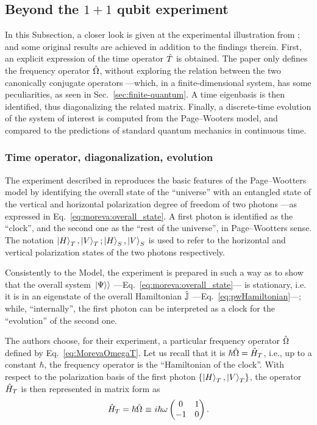 \subsection{Beyond the $1+1$ qubit experiment}\label{sec:beyondMoreva}

In this Subsection, a closer look is given at the experimental illustration from \cite{Moreva:illustration};
and some original results are achieved in addition to the findings therein.
%
First, an explicit expression of the time operator $\hat{T}$
is obtained.
The \mbox{paper} \parencite{Moreva:illustration}
only defines the frequency operator $\hat{\Omega}$,
without exploring the relation between the two canonically conjugate operators
---which, in a finite-dimensional system, has some peculiarities, as seen in Sec.~\ref{sec:finite-quantum}.
%
A time eigenbasis is then identified, thus diagonalizing the related matrix.
%
Finally, a discrete-time evolution of the system of interest is computed from the Page--Wooters model,
and compared to the predictions of
standard quantum mechanics in continuous time.

\subsubsection{Time operator, diagonalization, evolution}
\label{1qubitExp}

The experiment described in \citereset\cite{Moreva:illustration}
reproduces the basic features of the Page--Wootters model
by identifying the overall state of the ``universe'' with an entangled state of the vertical
and
horizontal polarization degree of freedom of two photons
---as expressed in Eq.~\eqref{eq:moreva:overall_state}.
A {first} photon is identified as the ``clock'',
and the {second} one as the ``rest of the universe'',
in Page--Wootters sense.
The notation $\ket{H}_T, \ket{V}_T; \ket{H}_S, \ket{V}_S$
is used to refer to the horizontal and vertical polarization states of the two photons respectively.

Consistently to the Model, the experiment is prepared in such a way
as to show that the overall system $\left.\left| \Psi \right\rangle\right\rangle$ ---Eq.~\eqref{eq:moreva:overall_state}---
is stationary,
i.e. it is in an eigenstate of the overall Hamiltonian $\hat{\mathbb{J}}$ ---Eq.~\eqref{eq:pwHamiltonian}---;
while, ``internally'', the first photon can be interpreted as a clock for the ``evolution'' of the second one.

The authors choose, for their experiment,
a particular
frequency operator $\hat{\Omega}$
defined by Eq.~\eqref{eq:MorevaOmegaT}.
Let us recall that it is $\hbar\hat{\Omega} = \hat{H}_T$,
i.e., up to a constant $\hbar$, the frequency operator is the ``Hamiltonian of the clock''.
With respect to the polarization basis of the first photon
$\qty{\ket{H}_T, \ket{V}_T}$,
the operator $\hat{H}_T$ is then represented in matrix form as
\begin{equation}\label{eq:H_T}
  \hat{H}_T = \hbar\hat{\Omega} \operatorname*{\,\equiv\,} {
    i\hbar\omega
    \begin{pmatrix}
      0 & 1 \\
     -1 & 0
    \end{pmatrix}
  } \, \text{.}
\end{equation}

